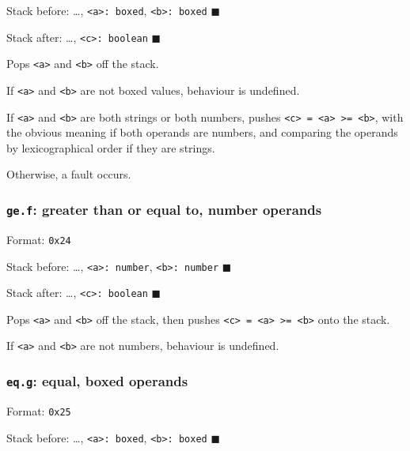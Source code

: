 Stack before: \ldots, \texttt{\textless{}a\textgreater{}:\ boxed},
\texttt{\textless{}b\textgreater{}:\ boxed} \(\blacksquare\)

Stack after: \ldots, \texttt{\textless{}c\textgreater{}:\ boolean}
\(\blacksquare\)

Pops \texttt{\textless{}a\textgreater{}} and
\texttt{\textless{}b\textgreater{}} off the stack.

If \texttt{\textless{}a\textgreater{}} and
\texttt{\textless{}b\textgreater{}} are not boxed values, behaviour is
undefined.

If \texttt{\textless{}a\textgreater{}} and
\texttt{\textless{}b\textgreater{}} are both strings or both numbers,
pushes
\texttt{\textless{}c\textgreater{}\ =\ \textless{}a\textgreater{}\ \textgreater{}=\ \textless{}b\textgreater{}},
with the obvious meaning if both operands are numbers, and comparing the
operands by lexicographical order if they are strings.

Otherwise, a fault occurs.

\subsubsection{\texorpdfstring{\texttt{ge.f}: greater than or equal to,
number operands}{ge.f: greater than or equal to, number operands}}

Format: \texttt{0x24}

Stack before: \ldots, \texttt{\textless{}a\textgreater{}:\ number},
\texttt{\textless{}b\textgreater{}:\ number} \(\blacksquare\)

Stack after: \ldots, \texttt{\textless{}c\textgreater{}:\ boolean}
\(\blacksquare\)

Pops \texttt{\textless{}a\textgreater{}} and
\texttt{\textless{}b\textgreater{}} off the stack, then pushes
\texttt{\textless{}c\textgreater{}\ =\ \textless{}a\textgreater{}\ \textgreater{}=\ \textless{}b\textgreater{}}
onto the stack.

If \texttt{\textless{}a\textgreater{}} and
\texttt{\textless{}b\textgreater{}} are not numbers, behaviour is
undefined.

\subsubsection{\texorpdfstring{\texttt{eq.g}: equal, boxed
operands}{eq.g: equal, boxed operands}}

Format: \texttt{0x25}

Stack before: \ldots, \texttt{\textless{}a\textgreater{}:\ boxed},
\texttt{\textless{}b\textgreater{}:\ boxed} \(\blacksquare\)

